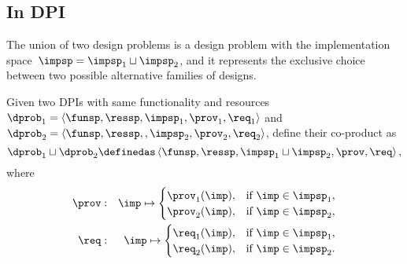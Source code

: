 \subsection{In DPI}\label{subsec:dpi-union}


The union of two design problems is a design problem with the implementation
space~$\impsp=\impsp_{1}\sqcup\impsp_{2}$, and it represents the
exclusive choice between two possible alternative families of designs.
\begin{definition}[Coproduct]
  \label{def:parallel-1}Given two DPIs with same functionality and
  resources~$\dprob_{1}=\left\langle \funsp,\ressp,\impsp_{1},\prov_{1},\req_{1}\right\rangle$
  and~$\dprob_{2}=\left\langle \funsp,\ressp,,\impsp_{2},\prov_{2},\req_{2}\right\rangle$,
  define their co-product as
  \begin{equation}
    \dprob_{1}\sqcup\dprob_{2}\definedas\left\langle \funsp,\ressp,\impsp_{1}\sqcup\impsp_{2},\prov,\req\right\rangle ,
  \end{equation}
  where
  \begin{eqnarray}
    \prov & : & \imp\mapsto\begin{cases}
                             \prov_{1}(\imp), & \text{if }\imp\in\impsp_{1},\\
                             \prov_{2}(\imp), & \text{if }\imp\in\impsp_{2},
    \end{cases}\label{eq:dppar-exec-1}\\
    \req & : & \imp\mapsto\begin{cases}
                            \req_{1}(\imp), & \text{if }\imp\in\impsp_{1},\\
                            \req_{2}(\imp), & \text{if }\imp\in\impsp_{2}.
    \end{cases}\nonumber
  \end{eqnarray}
\end{definition}

%


\begin{figure}[h!]
  \centering
  \caption{\label{fig:dpcoproduct}}
\end{figure}

